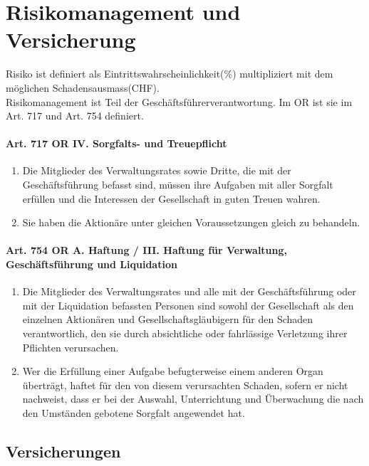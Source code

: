 \section{Risikomanagement und Versicherung}

Risiko ist definiert als Eintrittswahrscheinlichkeit(\%) multipliziert mit
dem möglichen Schadensausmass(CHF).\\

Risikomanagement ist Teil der Geschäftsführerverantwortung. Im OR ist sie im
Art. 717 und Art. 754 definiert.

\paragraph{Art. 717 OR IV. Sorgfalts- und Treuepflicht}
\begin{enumerate}
	\tightlist
	\item Die Mitglieder des Verwaltungsrates sowie Dritte, die mit der
	Geschäftsführung befasst sind, müssen ihre Aufgaben mit aller Sorgfalt
	erfüllen und die Interessen der Gesellschaft in guten Treuen wahren.
	\item Sie haben die Aktionäre unter gleichen Voraussetzungen gleich zu
	behandeln.
\end{enumerate}

\paragraph{Art. 754 OR A. Haftung / III. Haftung für Verwaltung,
Geschäftsführung und Liquidation}
\begin{enumerate}
	\tightlist
	\item Die Mitglieder des Verwaltungsrates und alle mit der Geschäftsführung
	oder mit der Liquidation befassten Personen sind sowohl der Gesellschaft als
	den einzelnen Aktionären und Gesellschaftsgläubigern für den Schaden
	verantwortlich, den sie durch absichtliche oder fahrlässige Verletzung ihrer
	Pflichten verursachen.
	\item Wer die Erfüllung einer Aufgabe befugterweise einem anderen Organ
	überträgt, haftet für den von diesem verursachten Schaden, sofern er nicht
	nachweist, dass er bei der Auswahl, Unterrichtung und Überwachung die nach
	den Umständen gebotene Sorgfalt angewendet hat.
\end{enumerate}

\subsection{Versicherungen}

